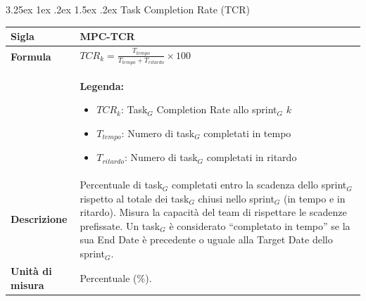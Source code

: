 \documentclass[a4paper, 10pt]{article}
\makeatletter
\renewcommand\paragraph{\@startsection{paragraph}{4}{\z@}%
  {3.25ex \@plus1ex \@minus .2ex}%
  {1.5ex \@plus .2ex}%
  {\normalfont\normalsize\bfseries}}
\makeatother
\begin{document}
\paragraph{Task Completion Rate (TCR)}
\mbox{} \\
\noindent
\begin{minipage}{\textwidth}
    \begin{tabularx}{\textwidth}{|>{\columncolor{bluBitless!10}\bfseries}p{3.5cm}|X|}
        \hline
        Sigla & MPC-TCR \\ \hline
        Formula &
        \textit{$TCR_{k} = \frac{T_{tempo}}{T_{tempo} + T_{ritardo}} \times 100$} \vspace{2mm} \\
        & \small \textbf{Legenda:}
        \begin{itemize}
            \item $TCR_{k}$: Task$_G$ Completion Rate allo sprint$_G$ $k$
            \item $T_{tempo}$: Numero di task$_G$ completati in tempo
            \item $T_{ritardo}$: Numero di task$_G$ completati in ritardo
        \end{itemize} \\ \hline
        Descrizione & Percentuale di task$_G$ completati entro la scadenza dello sprint$_G$ rispetto al totale dei task$_G$ chiusi nello sprint$_G$ (in tempo e in ritardo). Misura la capacità del team di rispettare le scadenze prefissate. Un task$_G$ è considerato ``completato in tempo'' se la sua End Date è precedente o uguale alla Target Date dello sprint$_G$. \\ \hline
        Unità di misura & Percentuale (\%). \\ \hline
    \end{tabularx}
\end{minipage}

\vspace{1cm}

\end{document}
